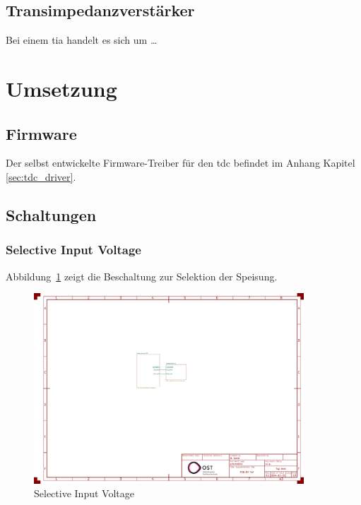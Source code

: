 \documentclass[11pt,a4paper,hidelinks]{article}
\begin{document}
\pagebreak

\subsection{Transimpedanzverstärker}

Bei einem \acrfull{tia} handelt es sich um \dots

\pagebreak

\section{Umsetzung}

\subsection{Firmware}

Der selbst entwickelte Firmware-Treiber für den \acrshort{tdc} befindet im Anhang Kapitel \ref{sec:tdc_driver}.

\pagebreak

\subsection{Schaltungen}

\subsubsection{Selective Input Voltage}

Abbildung~\ref{fig:selective_input_voltage} zeigt die Beschaltung zur Selektion der Speisung.

\begin{figure}[H]
    \centering
    \includegraphics[page=2, trim=80 590 750 50, clip, width=0.9\textwidth]{attachments/schematic.pdf}
    \caption{Selective Input Voltage}\label{fig:selective_input_voltage}
\end{figure}
\end{document}

